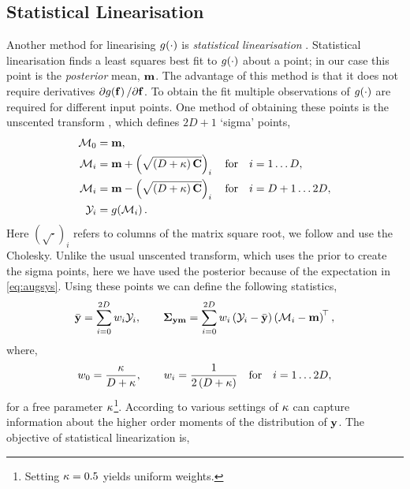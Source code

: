 \documentclass{article} %
\begin{document}
\subsection{Statistical Linearisation}

Another method for linearising $g\!\left({{\cdot}}\right)$ is \emph{statistical
    linearisation} \cite{Geist2010}. Statistical linearisation finds a least
squares best fit to $g\!\left({{\cdot}}\right)$ about a point; in our case this point is
the \emph{posterior} mean, $\mathbf{m}$. The advantage of this method is that it
does not require derivatives $\partial g\!\left({{\mathbf{f}}}\right)/\partial\mathbf{f}$. To
obtain the fit multiple observations of $g\!\left({{\cdot}}\right)$ are required for
different input points. One method of obtaining these points is the unscented
transform \cite{Julier2004}, which defines $2D+1$ `sigma' points,
\begin{align}
    \mathcal{M}_0 &= \mathbf{m},
        \label{eq:spoint0} \\
    \mathcal{M}_i &= \mathbf{m} + \left({\sqrt{\left({D + \kappa}\right) \mathbf{C}}}\right)_i \quad
        \text{for} \quad i = 1 \ldots D, \\
    \mathcal{M}_i &= \mathbf{m} - \left({\sqrt{\left({D + \kappa}\right) \mathbf{C}}}\right)_i \quad
        \text{for} \quad i = D+1 \ldots 2D,
        \label{eq:spointi} \\
    \mathcal{Y}_i &= g\!\left({{\mathcal{M}_i}}\right).
\end{align}
Here $(\sqrt{\cdot})_i$ refers to columns of the matrix square root, we follow
\cite{Julier2004} and use the Cholesky. Unlike the usual unscented transform,
which uses the prior to create the sigma points, here we have used the
posterior because of the expectation in \eqref{eq:augsys}. Using these points
we can define the following statistics,
\begin{equation}
    \bar{\mathbf{y}} = \sum^{2D}_{i=0} w_i \mathcal{Y}_i,
    \qquad
    \boldsymbol\Sigma_{\mathbf{y}\mathbf{m}} = \sum^{2D}_{i=0} w_i \left({\mathcal{Y}_i - \bar{\mathbf{y}}}\right)
        \left({\mathcal{M}_i - \mathbf{m}}\right)^{\!\top},
    \label{eq:slstats}
\end{equation}
where,
\begin{equation}
    w_0 = \frac{\kappa}{D + \kappa},
        \qquad w_i = \frac{1}{2\left({D + \kappa}\right)}
        \quad \text{for} \quad i = 1 \ldots 2D,
    \label{eq:slweights}
\end{equation}
for a free parameter $\kappa$\footnote{Setting $\kappa = 0.5$ yields
    uniform weights.}. According to \cite{Julier2004} various settings of
$\kappa$ can capture information about the higher order moments of the
distribution of $\mathbf{y}$. The objective of statistical linearization is,
\end{document}
